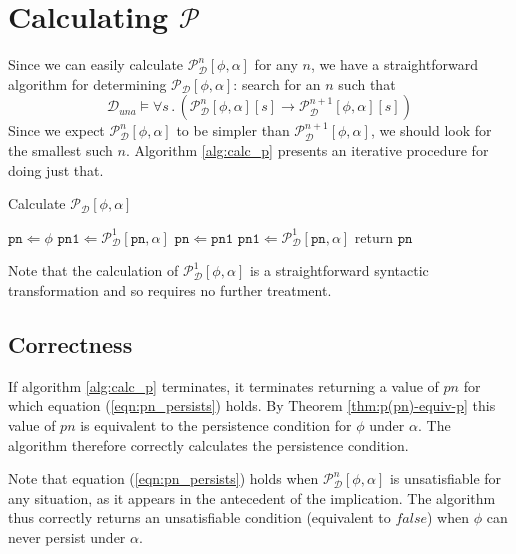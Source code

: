 \section{Calculating $\mathcal{P}$}

Since we can easily calculate $\mathcal{P}_{\mathcal{D}}^{n}[\phi,\alpha]$
for any $n$, we have a straightforward algorithm for determining
$\mathcal{P_{D}}[\phi,\alpha]$: search for an $n$ such that\[
\mathcal{D}_{una}\models\forall s\,.\,\left(\mathcal{P}_{\mathcal{D}}^{n}[\phi,\alpha][s]\rightarrow\mathcal{P}_{\mathcal{D}}^{n+1}[\phi,\alpha][s]\right)\]
 Since we expect $\mathcal{P}_{\mathcal{D}}^{n}[\phi,\alpha]$ to
be simpler than $\mathcal{P}_{\mathcal{D}}^{n+1}[\phi,\alpha]$, we
should look for the smallest such $n$. Algorithm \ref{alg:calc_p}
presents an iterative procedure for doing just that.

%
\begin{algorithm}
\caption{Calculate $\mathcal{P}_{\mathcal{D}}[\phi,\alpha]$}


\label{alg:calc_p} \begin{algorithmic} \STATE $\mathtt{pn}\Leftarrow\phi$
\STATE $\mathtt{pn1}\Leftarrow\mathcal{P}_{\mathcal{D}}^{1}[\mathtt{pn},\alpha]$
\STATE $\mathtt{pn}\Leftarrow\mathtt{pn1}$ \STATE $\mathtt{pn1}\Leftarrow\mathcal{P}_{\mathcal{D}}^{1}[\mathtt{pn},\alpha]$
\ENDWHILE \STATE return $\mathtt{pn}$ \end{algorithmic} 
\end{algorithm}


Note that the calculation of $\mathcal{P}_{\mathcal{D}}^{1}[\phi,\alpha]$
is a straightforward syntactic transformation and so requires no further
treatment.


\subsection{Correctness}

If algorithm \ref{alg:calc_p} terminates, it terminates returning
a value of $pn$ for which equation (\ref{eqn:pn_persists}) holds.
By Theorem \ref{thm:p(pn)-equiv-p} this value of $pn$ is equivalent
to the persistence condition for $\phi$ under $\alpha$. The algorithm
therefore correctly calculates the persistence condition.

Note that equation (\ref{eqn:pn_persists}) holds when $\mathcal{P}_{\mathcal{D}}^{n}[\phi,\alpha]$
is unsatisfiable for any situation, as it appears in the antecedent
of the implication. The algorithm thus correctly returns an unsatisfiable
condition (equivalent to $false$) when $\phi$ can never persist
under $\alpha$.


